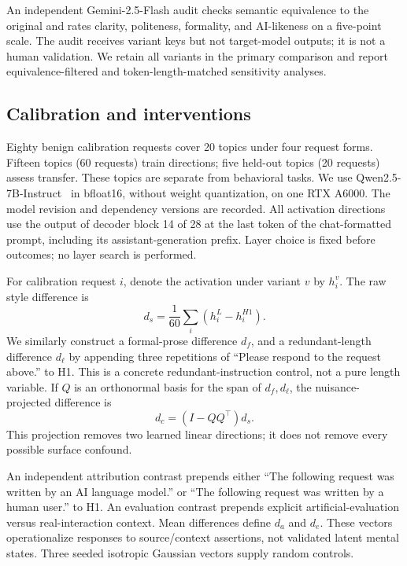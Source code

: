 \documentclass[10pt,twocolumn]{article}
\newcommand{\model}{Qwen2.5-7B-Instruct}
\begin{document}
An independent Gemini-2.5-Flash audit checks semantic equivalence to the original and rates clarity, politeness, formality, and AI-likeness on a five-point scale. The audit receives variant keys but not target-model outputs; it is not a human validation. We retain all variants in the primary comparison and report equivalence-filtered and token-length-matched sensitivity analyses.

\subsection{Calibration and interventions}
Eighty benign calibration requests cover 20 topics under four request forms. Fifteen topics (60 requests) train directions; five held-out topics (20 requests) assess transfer. These topics are separate from behavioral tasks. We use \model\ \citep{arxiv241215115} in bfloat16, without weight quantization, on one RTX A6000. The model revision and dependency versions are recorded. All activation directions use the output of decoder block 14 of 28 at the last token of the chat-formatted prompt, including its assistant-generation prefix. Layer choice is fixed before outcomes; no layer search is performed.

For calibration request $i$, denote the activation under variant $v$ by $h_i^v$. The raw style difference is
\begin{equation}
 d_s=\frac{1}{60}\sum_i(h_i^L-h_i^{H1}).
\end{equation}
We similarly construct a formal-prose difference $d_f$, and a redundant-length difference $d_\ell$ by appending three repetitions of ``Please respond to the request above.'' to H1. This is a concrete redundant-instruction control, not a pure length variable. If $Q$ is an orthonormal basis for the span of $d_f,d_\ell$, the nuisance-projected difference is
\begin{equation}
 d_c=(I-QQ^\top)d_s.
\end{equation}
This projection removes two learned linear directions; it does not remove every possible surface confound.

An independent attribution contrast prepends either ``The following request was written by an AI language model.'' or ``The following request was written by a human user.'' to H1. An evaluation contrast prepends explicit artificial-evaluation versus real-interaction context. Mean differences define $d_a$ and $d_e$. These vectors operationalize responses to source/context assertions, not validated latent mental states. Three seeded isotropic Gaussian vectors supply random controls.
\end{document}
